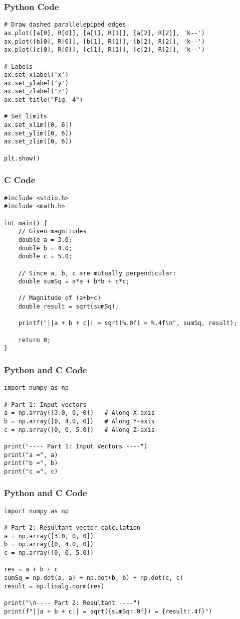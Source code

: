 \documentclass{beamer}
\begin{document}
\begin{frame}[fragile]
    \frametitle{Python Code}
    \begin{lstlisting}
# Draw dashed parallelepiped edges
ax.plot([a[0], R[0]], [a[1], R[1]], [a[2], R[2]], 'k--')
ax.plot([b[0], R[0]], [b[1], R[1]], [b[2], R[2]], 'k--')
ax.plot([c[0], R[0]], [c[1], R[1]], [c[2], R[2]], 'k--')

# Labels
ax.set_xlabel('x')
ax.set_ylabel('y')
ax.set_zlabel('z')
ax.set_title("Fig. 4")

# Set limits
ax.set_xlim([0, 6])
ax.set_ylim([0, 6])
ax.set_zlim([0, 6])

plt.show()
\end{lstlisting}
\end{frame}


\begin{frame}[fragile]
\frametitle{C Code}
\begin{lstlisting}
#include <stdio.h>
#include <math.h>

int main() {
    // Given magnitudes
    double a = 3.0;
    double b = 4.0;
    double c = 5.0;

    // Since a, b, c are mutually perpendicular:
    double sumSq = a*a + b*b + c*c;

    // Magnitude of (a+b+c)
    double result = sqrt(sumSq);

    printf("||a + b + c|| = sqrt(%.0f) = %.4f\n", sumSq, result);

    return 0;
}
\end{lstlisting}

\end{frame}

    \begin{frame}[fragile]
\frametitle{Python and C Code}

\begin{lstlisting}
import numpy as np

# Part 1: Input vectors
a = np.array([3.0, 0, 0])   # Along X-axis
b = np.array([0, 4.0, 0])   # Along Y-axis
c = np.array([0, 0, 5.0])   # Along Z-axis

print("---- Part 1: Input Vectors ----")
print("a =", a)
print("b =", b)
print("c =", c)

\end{lstlisting}

\end{frame}


    \begin{frame}[fragile]
\frametitle{Python and C Code}

\begin{lstlisting}
import numpy as np

# Part 2: Resultant vector calculation
a = np.array([3.0, 0, 0])
b = np.array([0, 4.0, 0])
c = np.array([0, 0, 5.0])

res = a + b + c
sumSq = np.dot(a, a) + np.dot(b, b) + np.dot(c, c)
result = np.linalg.norm(res)

print("\n---- Part 2: Resultant ----")
print(f"||a + b + c|| = sqrt({sumSq:.0f}) = {result:.4f}")

\end{lstlisting}

\end{frame}
\end{document}
